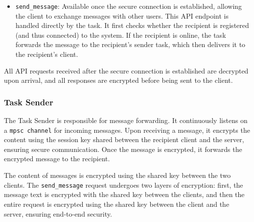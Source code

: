 \begin{itemize}
    \item \texttt{send\_message}: Available once the secure connection is established, allowing the client to exchange messages with other users. This API endpoint is handled directly by the task. It first checks whether the recipient is registered (and thus connected) to the system. If the recipient is online, the task forwards the message to the recipient's sender task, which then delivers it to the recipient's client.
\end{itemize}

All API requests received after the secure connection is established are decrypted upon arrival, and all responses are encrypted before being sent to the client. 

\subsubsection{Task Sender}
\label{subsec:TaskSender}

The Task Sender is responsible for message forwarding. It continuously listens on a \texttt{mpsc channel} for incoming messages. Upon receiving a message, it encrypts the content using the session key shared between the recipient client and the server, ensuring secure communication. Once the message is encrypted, it forwards the encrypted message to the recipient.

The content of messages is encrypted using the shared key between the two clients. The \texttt{send\_message} request undergoes two layers of encryption: first, the message text is encrypted with the shared key between the clients, and then the entire request is encrypted using the shared key between the client and the server, ensuring end-to-end security.

